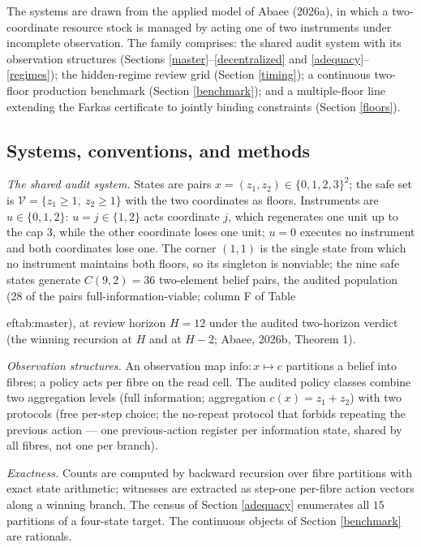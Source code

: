 \documentclass[10pt,twocolumn]{article}
\theoremstyle{definition}
\begin{document}
The systems are drawn from the applied model of Abaee (2026a), in which
a two-coordinate resource stock is managed by acting one of two
instruments under incomplete observation. The family comprises: the
shared audit system with its observation structures (Sections
\ref{master}--\ref{decentralized} and \ref{adequacy}--\ref{regimes});
the hidden-regime review grid (Section
\ref{timing}); a continuous two-floor production benchmark (Section
\ref{benchmark}); and a multiple-floor line extending the Farkas
certificate to jointly binding constraints (Section \ref{floors}).

\subsection{Systems, conventions, and methods}\label{frame}

\emph{The shared audit system.} States are pairs
\(x = (z_1, z_2) \in \{0,1,2,3\}^{2}\); the safe set is
\(\mathcal{V} = \{z_1 \ge 1,\ z_2 \ge 1\}\) with the two coordinates as
floors. Instruments are \(u \in \{0, 1, 2\}\): \(u = j \in \{1,2\}\)
acts coordinate \(j\), which regenerates one unit up to the cap \(3\),
while the other coordinate loses one unit; \(u = 0\) executes no
instrument and both coordinates lose one. The corner \((1,1)\) is the
single state from which no instrument maintains both floors, so its
singleton is nonviable; the nine safe states generate
\(C(9,2) = 36\) two-element belief pairs, the audited population (28 of the pairs full-information-viable; column F of Table

ef{tab:master}), at
review horizon \(H = 12\) under the audited two-horizon verdict (the
winning recursion at \(H\) and at \(H - 2\); Abaee, 2026b, Theorem 1).

\emph{Observation structures.} An observation map
\(\mathrm{info}: x \mapsto c\) partitions a belief into fibres; a policy
acts per fibre on the read cell. The audited policy classes combine two
aggregation levels (full information; aggregation
\(c(x) = z_1 + z_2\)) with two protocols (free per-step choice; the
no-repeat protocol that forbids repeating the previous action --- one
previous-action register per information state, shared by all fibres,
not one per branch).

\emph{Exactness.} Counts are computed by backward recursion over fibre
partitions with exact state arithmetic; witnesses are extracted as
step-one per-fibre action vectors along a winning branch. The census of
Section \ref{adequacy} enumerates all \(15\) partitions of a four-state
target. The continuous objects of Section \ref{benchmark} are rationals.
\end{document}
